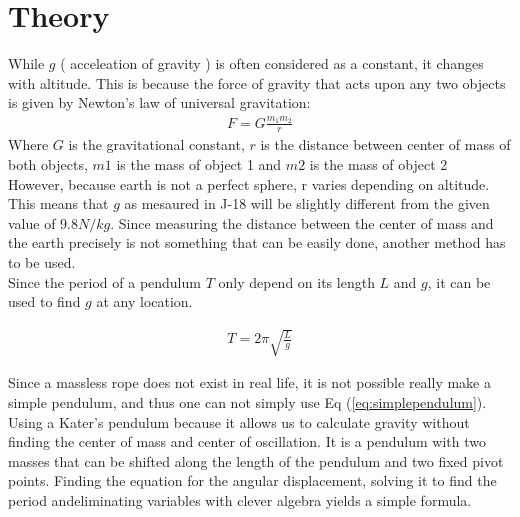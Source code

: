 \documentclass{report}
\begin{document}
\section*{Theory}

While $g$ ( acceleation of gravity ) is often considered as a constant, it changes with altitude. This is because the force of gravity that acts upon any two objects is given by Newton’s law of universal gravitation:
\begin{gather}
    F=G\frac{m_1m_2}{r}
\end{gather}
Where $G$ is the gravitational constant, $r$ is the distance between center of mass of both objects, $m1$ is the mass of object 1 and $m2$ is the mass of object 2\\

However, because earth is not a perfect sphere, r varies depending on altitude. This means that $g$ as mesaured in J-18 will be slightly different from the given value of $9.8 N/kg$. Since measuring the distance between the center of mass and the earth precisely is not something that can be easily done, another method has to be used.\\ 

Since the period of a pendulum $T$ only depend on its length $L$  and $g$, it can be used to find $g$ at any location.

\begin{gather}
    T=2\pi\sqrt{\frac{L}{g}} \label{eq:simplependulum}
\end{gather}

Since a massless rope does not exist in real life, it is not possible really make a simple pendulum, and thus one can not simply use Eq (\ref{eq:simplependulum}). Using a Kater’s pendulum because it allows us to calculate gravity without finding the center of mass and center of oscillation. It is a pendulum with two masses that can be shifted along the length of the pendulum and two fixed pivot points. Finding the equation for the angular displacement, solving it to find the period andeliminating variables with clever algebra yields a simple formula.
\end{document}
